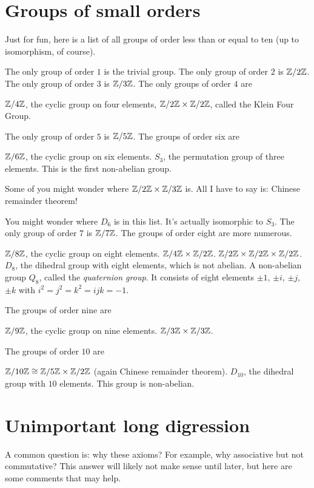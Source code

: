 \section{Groups of small orders}
Just for fun, here is a list of all groups of order less than or equal to ten
(up to isomorphism, of course).
\begin{enumerate}
	\ii The only group of order $1$ is the trivial group.
	\ii The only group of order $2$ is $\mathbb Z/2\mathbb Z$.
	\ii The only group of order $3$ is $\mathbb Z/3\mathbb Z$.
	\ii The only groups of order $4$ are
	\begin{itemize}
		\ii $\mathbb Z/4\mathbb Z$, the cyclic group on four elements,
		\ii $\mathbb Z/2\mathbb Z \times \mathbb Z/2\mathbb Z$, called the Klein Four Group.
	\end{itemize}
	\ii The only group of order $5$ is $\mathbb Z/5\mathbb Z$.
	\ii The groups of order six are
	\begin{itemize}
		\ii $\mathbb Z/6\mathbb Z$, the cyclic group on six elements.
		\ii $S_3$, the permutation group of three elements.
		This is the first non-abelian group.
	\end{itemize}
	Some of you might wonder where $\mathbb Z/2\mathbb Z \times \mathbb Z/3\mathbb Z$ is.
	All I have to say is: Chinese remainder theorem!

	You might wonder where $D_6$ is in this list.
	It's actually isomorphic to $S_3$.
	\ii The only group of order $7$ is $\mathbb Z/7\mathbb Z$.
	\ii The groups of order eight are more numerous.
	\begin{itemize}
		\ii $\mathbb Z/8\mathbb Z$, the cyclic group on eight elements.
		\ii $\mathbb Z/4\mathbb Z \times \mathbb Z/2\mathbb Z$.
		\ii $\mathbb Z/2\mathbb Z \times \mathbb Z/2\mathbb Z \times \mathbb Z/2\mathbb Z$.
		\ii $D_8$, the dihedral group with eight elements, which is not abelian.
		\ii A non-abelian group $Q_8$, called the \emph{quaternion group}.
		It consists of eight elements $\pm 1$, $\pm i$, $\pm j$, $\pm k$
		with $i^2=j^2=k^2=ijk=-1$.
	\end{itemize}
	\ii The groups of order nine are
	\begin{itemize}
		\ii $\mathbb Z/9\mathbb Z$, the cyclic group on nine elements.
		\ii $\mathbb Z/3\mathbb Z \times \mathbb Z/3\mathbb Z$.
	\end{itemize}
	\ii The groups of order $10$ are
	\begin{itemize}
		\ii $\mathbb Z/10\mathbb Z \cong \mathbb Z/5\mathbb Z \times \mathbb Z/2\mathbb Z$ (again Chinese remainder theorem).
		\ii $D_{10}$, the dihedral group with $10$ elements.
		This group is non-abelian.
	\end{itemize}
\end{enumerate}

\section{Unimportant long digression}
A common question is: why these axioms?
For example, why associative but not commutative?
This answer will likely not make sense until later,
but here are some comments that may help.

